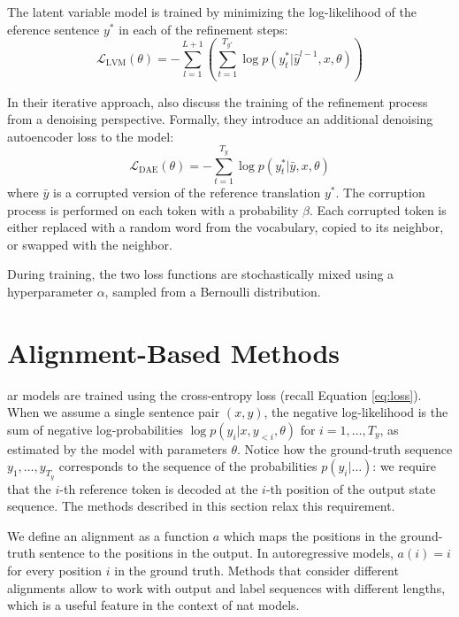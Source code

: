 The latent variable model is trained by minimizing the log-likelihood of the
eference sentence $y^*$ in each of the refinement steps:
\begin{equation}
  \mathcal{L}_{\text{LVM}}(\theta) = - \sum_{l=1}^{L+1} \left(
    \sum_{t=1}^{T_{y^*}} \log p(y_t^* | \hat{y}^{l-1}, x, \theta)
  \right) \label{eq:refinement-lvm-loss}
\end{equation}

In their iterative approach, \citet{lee-etal-2018-deterministic} also discuss
the training of the refinement process from a denoising perspective. Formally,
they introduce an additional denoising autoencoder loss to the model:
%
\begin{equation}
  \mathcal{L}_{\text{DAE}}(\theta) = - \sum_{t=1}^{T_y} \log p(y_t^* | \bar{y}, x, \theta)
\end{equation}
where $\bar{y}$ is a corrupted version of the reference translation $y^*$. The
corruption process is performed on each token with a probability $\beta$. Each
corrupted token is either replaced with a random word from the vocabulary,
copied to its neighbor, or swapped with the neighbor.

During training, the two loss functions are stochastically mixed using a
hyperparameter $\alpha$, sampled from a Bernoulli distribution.

\section{Alignment-Based Methods}%
\label{sec:nat:alignment}

\Acl{ar} models are trained using the cross-entropy loss (recall Equation
\ref{eq:loss}). When we assume a single sentence pair $(x,y)$, the negative
log-likelihood is the sum of negative log-probabilities
$\log p(y_i|x, y_{<i}, \theta)$ for $i=1, \ldots, T_y$, as estimated by the
model with parameters $\theta$.  Notice how the ground-truth sequence
$y_1, \ldots, y_{T_y}$ corresponds to the sequence of the probabilities
$p(y_i|\ldots)$: we require that the $i$-th reference token is decoded at the
$i$-th position of the output state sequence. The methods described in this
section relax this requirement.

We define an alignment as a function $a$ which maps the positions in the
ground-truth sentence to the positions in the output. In autoregressive
models, $a(i) = i$ for every position $i$ in the ground truth. %
Methods that consider different alignments allow to work with output and label
sequences with different lengths, which is a useful feature in the context of
\ac{nat} models.

